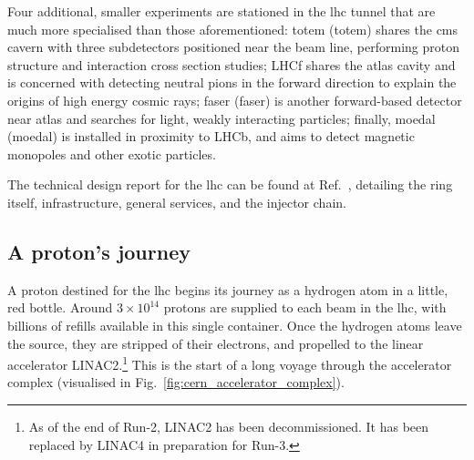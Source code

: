 Four additional, smaller experiments are stationed in the \acrshort{lhc} tunnel that are much more specialised than those aforementioned: \acrshort{totem} (\acrlong{totem}) shares the \acrshort{cms} cavern with three subdetectors positioned near the beam line, performing proton structure and interaction cross section studies; LHCf shares the \acrshort{atlas} cavity and is concerned with detecting neutral pions in the forward direction to explain the origins of high energy cosmic rays; \acrshort{faser} (\acrlong{faser}) is another forward-based detector near \acrshort{atlas} and searches for light, weakly interacting particles; finally, \acrshort{moedal} (\acrlong{moedal}) is installed in proximity to LHCb, and aims to detect magnetic monopoles and other exotic particles.

The technical design report for the \acrshort{lhc} can be found at Ref.~, detailing the ring itself, infrastructure, general services, and the injector chain.




\subsection{A proton's journey}  %
\label{subsec:protons_journey}

A proton destined for the \acrshort{lhc} begins its journey as a hydrogen atom in a little, red bottle. Around $\text{3}\times\text{10}^{\text{14}}$ protons are supplied to each beam in the \acrshort{lhc}, with billions of refills available in this single container. Once the hydrogen atoms leave the source, they are stripped of their electrons, and propelled to the linear accelerator LINAC2.\footnote{As of the end of Run-2, LINAC2 has been decommissioned. It has been replaced by LINAC4 in preparation for Run-3.} This is the start of a long voyage through the accelerator complex (visualised in Fig.~\ref{fig:cern_accelerator_complex}).

